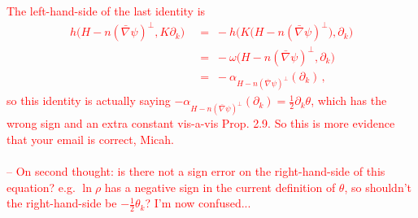 \documentclass[12pt,letterpaper]{amsart}%
\numberwithin{mycounter}{section}
\theoremstyle{plain}
\numberwithin{equation}{section}
\theoremstyle{definition}
\begin{document}
\bigskip

\textcolor{red}{
The left-hand-side of the last identity is
\begin{align*}
    h\Big(H-n(\bar{\nabla}\psi)^{\perp}, K\partial_{k}\Big) 
        \;&=\; -h\Big(K\big(H-n(\bar{\nabla}\psi)^{\perp}\big), \partial_{k}\Big) \\
        \;&=\; -\omega\Big(H-n(\bar{\nabla}\psi)^{\perp},\partial_k\Big) \\
        \;&=\; -\alpha_{H-n(\bar{\nabla}\psi)^{\perp}}(\partial_k)\,,
\end{align*}
so this identity is actually saying $-\alpha_{H-n(\bar{\nabla}\psi)^{\perp}}(\partial_k)=\frac{1}{2}\partial_k\theta$, which has the wrong sign and an extra constant vis-a-vis Prop. 2.9. So this is more evidence that your email is correct, Micah. \\\\
-- On second thought: is there not a sign error on the right-hand-side of this equation? e.g. $\ln\rho$ has a negative sign in the current definition of $\theta$, so shouldn't the right-hand-side be $-\frac{1}{2}\theta_k$? I'm now confused...
}

\bigskip
\end{document}
